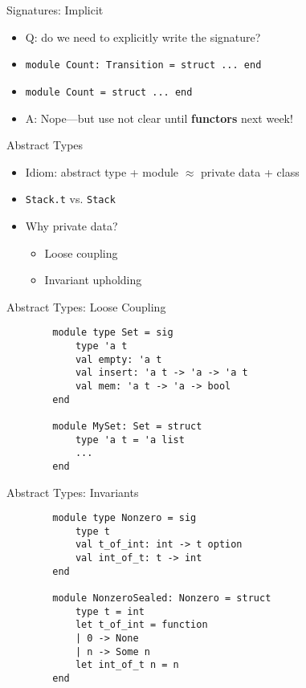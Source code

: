 \documentclass{beamer}
\newcommand{\code}[1]{\texttt{#1}}
\begin{document}
    \begin{frame}{Signatures: Implicit}
        \begin{itemize}
            \item<1-> Q: do we need to explicitly write the signature?
            \item<2-> \code{module Count: Transition = struct ... end}
            \item<2-> \code{module Count = struct ... end}
            \item<3-> A: Nope---but use not clear until \textbf{functors} next week!
        \end{itemize}
    \end{frame}

    \begin{frame}{Abstract Types}
        \begin{itemize}
            \item<1-> Idiom: abstract type + module $\approx$ private data + class
            \item<2-> \code{Stack.t} vs. \code{Stack}
            \item<3-> Why private data?
            \begin{itemize}
                \item<4-> Loose coupling
                \item<5-> Invariant upholding
            \end{itemize}
        \end{itemize}
    \end{frame}

    \begin{frame}[fragile=singleslide]{Abstract Types: Loose Coupling}
        \begin{verbatim}
        module type Set = sig 
            type 'a t
            val empty: 'a t
            val insert: 'a t -> 'a -> 'a t
            val mem: 'a t -> 'a -> bool
        end

        module MySet: Set = struct
            type 'a t = 'a list
            ...
        end
        \end{verbatim}
    \end{frame}

    \begin{frame}[fragile=singleslide]{Abstract Types: Invariants}
        \begin{verbatim}
        module type Nonzero = sig
            type t
            val t_of_int: int -> t option
            val int_of_t: t -> int
        end

        module NonzeroSealed: Nonzero = struct
            type t = int
            let t_of_int = function
            | 0 -> None
            | n -> Some n
            let int_of_t n = n
        end
        \end{verbatim}
    \end{frame}
\end{document}
